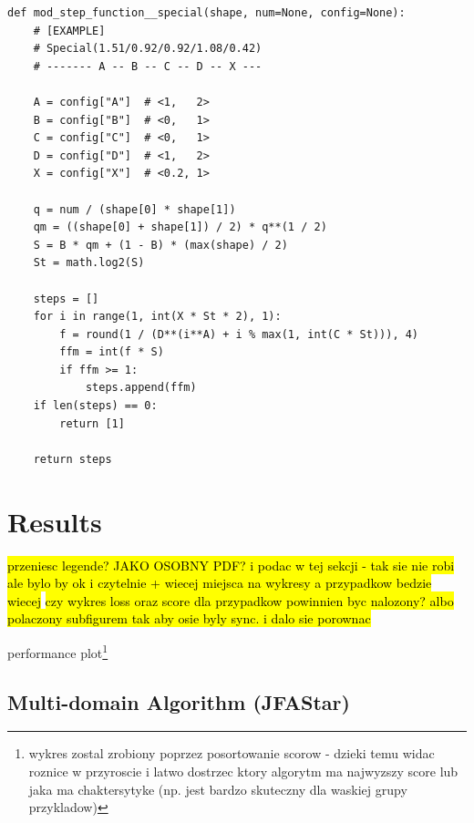 \documentclass[format=acmsmall,screen,review,authordraft,nonacm]{acmart}
\newcommand{\ourjfasingle}{JFAStar}
\begin{document}
\begin{lstlisting}
def mod_step_function__special(shape, num=None, config=None):
    # [EXAMPLE]
    # Special(1.51/0.92/0.92/1.08/0.42)
    # ------- A -- B -- C -- D -- X --- 

    A = config["A"]  # <1,   2>
    B = config["B"]  # <0,   1>
    C = config["C"]  # <0,   1>
    D = config["D"]  # <1,   2>
    X = config["X"]  # <0.2, 1>

    q = num / (shape[0] * shape[1])
    qm = ((shape[0] + shape[1]) / 2) * q**(1 / 2)
    S = B * qm + (1 - B) * (max(shape) / 2)
    St = math.log2(S)

    steps = []
    for i in range(1, int(X * St * 2), 1):
        f = round(1 / (D**(i**A) + i % max(1, int(C * St))), 4)
        ffm = int(f * S)
        if ffm >= 1:
            steps.append(ffm)
    if len(steps) == 0:
        return [1]

    return steps
\end{lstlisting}

\section{Results} %

\hl {przeniesc legende? JAKO OSOBNY PDF? i podac w tej sekcji - tak sie nie robi
ale bylo by ok i czytelnie + wiecej miejsca na wykresy a przypadkow bedzie
wiecej}
\hl{czy wykres loss oraz score dla przypadkow powinnien byc nalozony? albo
polaczony subfigurem tak aby osie byly sync. i dalo sie porownac}

performance plot\footnote{wykres zostal zrobiony poprzez posortowanie scorow - dzieki temu widac roznice w
przyroscie i latwo dostrzec ktory algorytm ma najwyzszy score lub jaka ma
chaktersytyke (np. jest bardzo skuteczny dla waskiej grupy przykladow)
}

\subsection{Multi-domain Algorithm (\ourjfasingle)} %
\end{document}
